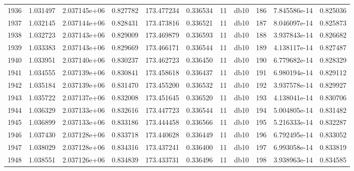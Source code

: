 \begin{tabular}{lrrrrrrlrrr}
1936 &    1.031497 &        2.037145e+06 &  0.827782 &              173.477234 &    0.336534 &      11 &         db10 &    186 &   7.845586e-14 &      0.825036 \\
1937 &    1.032145 &        2.037144e+06 &  0.828431 &              173.473816 &    0.336521 &      11 &         db10 &    187 &   8.046097e-14 &      0.825873 \\
1938 &    1.032723 &        2.037143e+06 &  0.829009 &              173.469879 &    0.336593 &      11 &         db10 &    188 &   3.937843e-14 &      0.826682 \\
1939 &    1.033383 &        2.037143e+06 &  0.829669 &              173.466171 &    0.336544 &      11 &         db10 &    189 &   4.138117e-14 &      0.827487 \\
1940 &    1.033951 &        2.037140e+06 &  0.830237 &              173.462723 &    0.336450 &      11 &         db10 &    190 &   6.779682e-14 &      0.828329 \\
1941 &    1.034555 &        2.037139e+06 &  0.830841 &              173.458618 &    0.336437 &      11 &         db10 &    191 &   6.980194e-14 &      0.829112 \\
1942 &    1.035184 &        2.037139e+06 &  0.831470 &              173.455200 &    0.336532 &      11 &         db10 &    192 &   3.937578e-14 &      0.829927 \\
1943 &    1.035722 &        2.037137e+06 &  0.832008 &              173.451645 &    0.336520 &      11 &         db10 &    193 &   4.138041e-14 &      0.830706 \\
1944 &    1.036329 &        2.037133e+06 &  0.832616 &              173.447723 &    0.336544 &      11 &         db10 &    194 &   5.004805e-14 &      0.831482 \\
1945 &    1.036899 &        2.037133e+06 &  0.833186 &              173.444458 &    0.336566 &      11 &         db10 &    195 &   5.216333e-14 &      0.832287 \\
1946 &    1.037430 &        2.037128e+06 &  0.833718 &              173.440628 &    0.336449 &      11 &         db10 &    196 &   6.792495e-14 &      0.833052 \\
1947 &    1.038029 &        2.037128e+06 &  0.834316 &              173.437241 &    0.336400 &      11 &         db10 &    197 &   6.993058e-14 &      0.833819 \\
1948 &    1.038551 &        2.037126e+06 &  0.834839 &              173.433731 &    0.336496 &      11 &         db10 &    198 &   3.938963e-14 &      0.834585 \\

\end{tabular}
